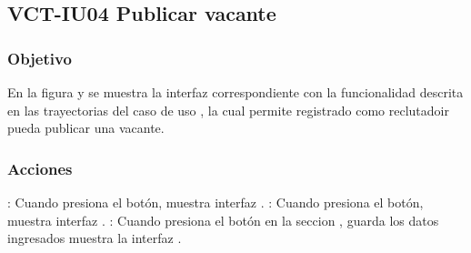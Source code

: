 \clearpage
\subsection{VCT-IU04 Publicar vacante}

\subsubsection{Objetivo}
En la figura  y   se muestra la interfaz correspondiente con la funcionalidad descrita en las
trayectorias del caso de uso  , la cual permite registrado como reclutadoir pueda publicar una vacante.
\subsubsection{Acciones}


\Titem {} : Cuando presiona el botón, muestra interfaz .
\Titem {} : Cuando presiona el botón, muestra interfaz .
\Titem {} : Cuando presiona el botón en la seccion  , guarda los datos ingresados muestra la interfaz .

 

\clearpage
